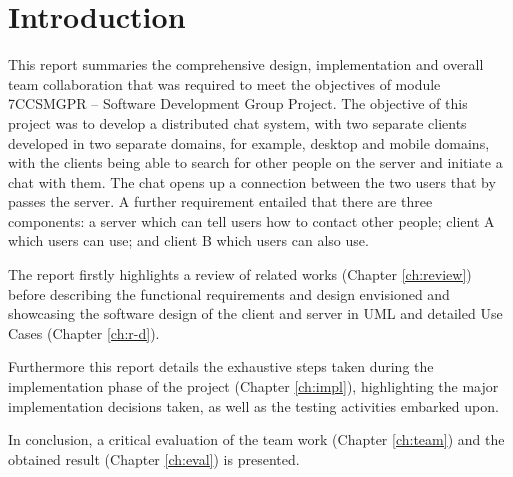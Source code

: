 \documentclass[finalReport.tex]{subfiles}
\begin{document}
\chapter{Introduction}

This report summaries the comprehensive design, implementation and overall team collaboration that was required to meet the objectives of module 7CCSMGPR – Software Development Group Project. The objective of this project was to develop a distributed chat system, with two separate clients developed in two separate domains, for example, desktop and mobile domains, with the clients being able to search for other people on the server and initiate a chat with them. The chat opens up a connection between the two users that by passes the server. A further requirement entailed that there are three components: a server which can tell users how to contact other people; client A which users can use; and client B which users can also use.

The report firstly highlights a review of related works (Chapter \ref{ch:review}) before describing the functional requirements and design envisioned and showcasing the software design of the client and server in UML and detailed Use Cases (Chapter \ref{ch:r-d}).

Furthermore this report details the exhaustive steps taken during the implementation phase of the project (Chapter \ref{ch:impl}), highlighting the major implementation decisions taken, as well as the testing activities embarked upon.

In conclusion, a critical evaluation of the team work (Chapter \ref{ch:team}) and the obtained result (Chapter \ref{ch:eval}) is presented.
\end{document}
